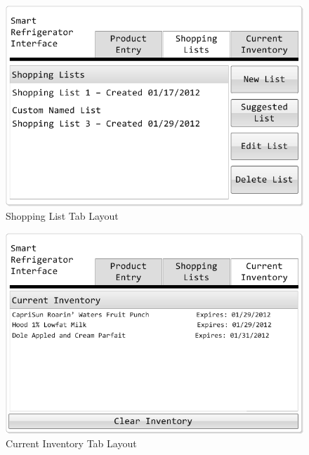 \documentclass[11pt]{article} %
\begin{document}
\begin{figure}[h!]
\begin{center}
\includegraphics[scale=0.5]{MockUp2}
\caption{Shopping List Tab Layout}
\label{mock2}
\end{center}
\end{figure}
\pagebreak
\begin{figure}[h!]
\vspace{0.5cm}
\begin{center}
\includegraphics[scale=0.5]{MockUp3}
\caption{Current Inventory Tab Layout}
\label{mock3}
\end{center}
\end{figure}
\end{document}
